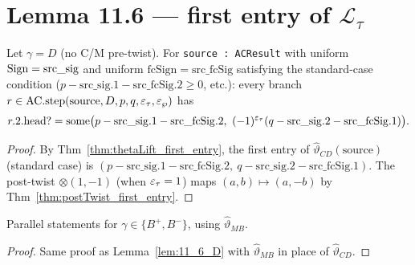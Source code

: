 \section{Lemma 11.6 — first entry of $\mathcal{L}_\tau$}

\begin{lemma}
  \label{lem:11_6_D}
  \leanok
  Let $\gamma = D$ (no C/M pre-twist). For \texttt{source : ACResult} with uniform
  $\mathrm{Sign} = \mathrm{src\_sig}$ and uniform $\mathrm{fcSign} = \mathrm{src\_fcSig}$ satisfying the
  standard-case condition ($p - \mathrm{src\_sig}.1 - \mathrm{src\_fcSig}.2 \geq 0$, etc.):
  every branch $r \in \mathrm{AC.step}(\mathrm{source}, D, p, q, \varepsilon_\tau, \varepsilon_\wp)$ has
  \[ r.2.\mathrm{head?} = \mathrm{some}\big(p - \mathrm{src\_sig}.1 - \mathrm{src\_fcSig}.2,\ (-1)^{\eps_\tau}(q - \mathrm{src\_sig}.2 - \mathrm{src\_fcSig}.1)\big). \]
\end{lemma}

\begin{proof}
  \leanok
  By Thm~\ref{thm:thetaLift_first_entry}, the first entry of $\hat\vartheta_{CD}(\mathrm{source})$ (standard case) is
  $(p - \mathrm{src\_sig}.1 - \mathrm{src\_fcSig}.2,\ q - \mathrm{src\_sig}.2 - \mathrm{src\_fcSig}.1)$.
  The post-twist $\otimes(1, -1)$ (when $\varepsilon_\tau = 1$) maps $(a, b) \mapsto (a, -b)$ by Thm~\ref{thm:postTwist_first_entry}.
\end{proof}

\begin{lemma}[Lemma 11.6 $B^+ / B^-$]
  \label{lem:11_6_B}
  \leanok
  Parallel statements for $\gamma \in \{B^+, B^-\}$, using $\hat\vartheta_{MB}$.
\end{lemma}
\begin{proof}
  \leanok
  Same proof as Lemma~\ref{lem:11_6_D} with $\hat\vartheta_{MB}$ in place of $\hat\vartheta_{CD}$.
\end{proof}



